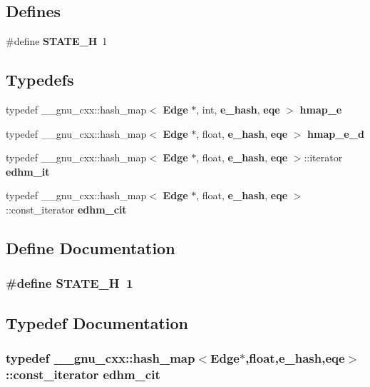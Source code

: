 \subsection*{Defines}
\begin{CompactItemize}
\item 
\#define {\bf STATE\_\-H}~1
\end{CompactItemize}
\subsection*{Typedefs}
\begin{CompactItemize}
\item 
typedef \_\-\_\-gnu\_\-cxx::hash\_\-map$<$ {\bf Edge} $\ast$, int, {\bf e\_\-hash}, {\bf eqe} $>$ {\bf hmap\_\-e}
\item 
typedef \_\-\_\-gnu\_\-cxx::hash\_\-map$<$ {\bf Edge} $\ast$, float, {\bf e\_\-hash}, {\bf eqe} $>$ {\bf hmap\_\-e\_\-d}
\item 
typedef \_\-\_\-gnu\_\-cxx::hash\_\-map$<$ {\bf Edge} $\ast$, float, {\bf e\_\-hash}, {\bf eqe} $>$::iterator {\bf edhm\_\-it}
\item 
typedef \_\-\_\-gnu\_\-cxx::hash\_\-map$<$ {\bf Edge} $\ast$, float, {\bf e\_\-hash}, {\bf eqe} $>$::const\_\-iterator {\bf edhm\_\-cit}
\end{CompactItemize}


\subsection{Define Documentation}
\subsubsection{\setlength{\rightskip}{0pt plus 5cm}\#define STATE\_\-H~1}\label{state_8h_37e6e3fdf875b2d9551359bc749c71fd}




\subsection{Typedef Documentation}
\subsubsection{\setlength{\rightskip}{0pt plus 5cm}typedef \_\-\_\-gnu\_\-cxx::hash\_\-map$<${\bf Edge}$\ast$,float,{\bf e\_\-hash},{\bf eqe}$>$::const\_\-iterator {\bf edhm\_\-cit}}\label{state_8h_69cceb982d6e3eda0ede070552c10430}


